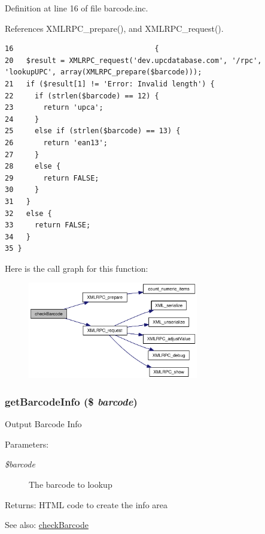 Definition at line 16 of file barcode.inc.

References XMLRPC\_\-prepare(), and XMLRPC\_\-request().

\begin{Code}\begin{verbatim}16                                 {
20   $result = XMLRPC_request('dev.upcdatabase.com', '/rpc', 'lookupUPC', array(XMLRPC_prepare($barcode)));
21   if ($result[1] != 'Error: Invalid length') {
22     if (strlen($barcode) == 12) {
23       return 'upca';
24     }
25     else if (strlen($barcode) == 13) {
26       return 'ean13';
27     }
28     else {
29       return FALSE;
30     }
31   }
32   else {
33     return FALSE;
34   }
35 }
\end{verbatim}
\end{Code}




Here is the call graph for this function:\nopagebreak
\begin{figure}[H]
\begin{center}
\leavevmode
\includegraphics[width=211pt]{barcode_8inc_6d3645af0ef526e4f64d28dcbdceb74f_cgraph}
\end{center}
\end{figure}
\hypertarget{barcode_8inc_e10c37e4f9f9b7c6617a388351a27c99}{
\subsubsection{\setlength{\rightskip}{0pt plus 5cm}getBarcodeInfo (\$ {\em barcode})}}
\label{barcode_8inc_e10c37e4f9f9b7c6617a388351a27c99}


Output Barcode Info \begin{Desc}
\item[Parameters:]
\begin{description}
\item[{\em \$barcode}]The barcode to lookup \end{description}
\end{Desc}
\begin{Desc}
\item[Returns:]HTML code to create the info area \end{Desc}
\begin{Desc}
\item[See also:]\hyperlink{barcode_8inc_6d3645af0ef526e4f64d28dcbdceb74f}{checkBarcode} \end{Desc}


